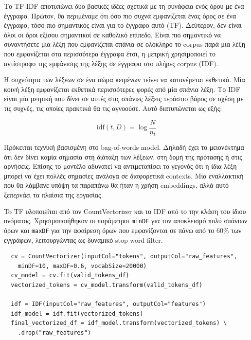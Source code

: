 \documentclass[a4paper,12pt]{article}
\begin{document}
Το TF‐IDF αποτυπώνει δύο βασικές ιδέες σχετικά με τη συνάφεια ενός όρου με ένα
έγγραφο. Πρώτον, θα περιμέναμε ότι όσο πιο συχνά εμφανίζεται ένας όρος σε ένα έγγραφο, τόσο πιο σημαντικός είναι για το έγγραφο αυτό (TF). Δεύτερον, δεν είναι όλοι οι όροι εξίσου σημαντικοί σε καθολικό επίπεδο. Είναι πιο σημαντικό να συναντήσετε μια λέξη που εμφανίζεται σπάνια σε ολόκληρο το corpus παρά μια λέξη που εμφανίζεται στα περισσότερα έγγραφα έτσι, η μετρική χρησιμοποιεί το αντίστροφο της εμφάνισης της λέξης σε έγγραφα στο πλήρες corpus (IDF).

Η συχνότητα των λέξεων σε ένα σώμα κειμένων τείνει να κατανέμεται εκθετικά. Μία κοινή λέξη εμφανίζεται εκθετικά περισσότερες φορές από μία σπάνια λέξη. Το IDF είναι μία μετρική που δίνει σε αυτές στις σπάνιες λέξεις τεράστιο βάρος σε σχέση με τις συχνές, τις οποίες πρακτικά θα τις αγνοούσε. Αυτό διατυπώνεται ως εξής:

\begin{equation}
    {\displaystyle \mathrm {idf} (t,D)=\log {\frac {N}{n_{t}}}}
\end{equation}

Πρόκειται τεχνική βασισμένη στο bag-of-words model. Δηλαδή έχει το μειονέκτημα ότι δεν δίνει καμία σημασία στη διάταξη των λέξεων, στη δομή της πρότασης ή στις αρνήσεις. Επίσης το μοντέλο αδυνατεί να αντιμετοπίσει το γεγονός ότι η ίδια λέξη μπορεί να έχει πολλές σημασίες ανάλογα σε διαφορετικά contexts. Μία εναλλακτική που θα λάμβανε υπόψη τα παραπάνω θα ήταν η χρήση embeddings, αλλά αυτό ξεπερνάει τα πλαίσια της εργασίας.

To TF υλοποιείται από τον CountVectorizer και το IDF από το την κλάση του ίδιου ονόματος. Χρησιμοποιήθηκαν οι παράμετροι \texttt{minDF} για τον αποκλεισμό πολύ σπάνιων όρων και \texttt{maxDF} για την αφαίρεση όρων που εμφανίζονται σε πάνω από το 60\% των εγγράφων, λειτουργώντας ως δυναμικό stop-word filter.

\begin{verbatim}
  cv = CountVectorizer(inputCol="tokens", outputCol="raw_features",
    minDF=10, maxDF=0.6, vocabSize=20000)
  cv_model = cv.fit(valid_tokens_df)
  vectorized_tokens = cv_model.transform(valid_tokens_df)

  idf = IDF(inputCol="raw_features", outputCol="features")
  idf_model = idf.fit(vectorized_tokens)
  final_vectorized_df = idf_model.transform(vectorized_tokens) \
    .drop("raw_features")
\end{verbatim}
\end{document}
